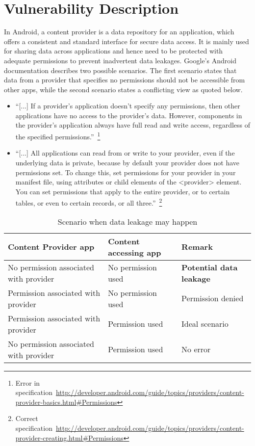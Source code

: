 \section{Vulnerability Description}
\label{vuln}
\noindent
In Android, a content provider is a data repository for an application, which offers a consistent and standard interface for secure data access. It is mainly used for sharing data across applications and hence need to be protected with adequate permissions to prevent inadvertent data leakages. Google's Android documentation describes two possible scenarios. The first scenario states that data from a provider that specifies no permissions should not be accessible from other apps, while the second scenario states a conflicting view as quoted below.
\begin{itemize}
 \item ``[...] If a provider's application doesn't specify any permissions, then other applications have no access to the provider's data. However, components in the provider's application always have full read and write access, regardless of the specified permissions.''~\footnote{Error in specification~\url{http://developer.android.com/guide/topics/providers/content-provider-basics.html#Permissions}}
 \item ``[...] All applications can read from or write to your provider, even if the underlying data is private, because by default your provider does not have permissions set. To change this, set permissions for your provider in your manifest file, using attributes or child elements of the <provider> element. You can set permissions that apply to the entire provider, or to certain tables, or even to certain records, or all three.''~\footnote{Correct specification~\url{http://developer.android.com/guide/topics/providers/content-provider-creating.html#Permissions}}
\end{itemize}
\begin{center}
	\begin{table}
		\label{tableErrors}
		\begin{tabular}{ | p{2.5cm} | p{2.5cm} | p{2cm} | }
			\hline
			\textbf{Content Provider app} & \textbf{Content accessing app} & \textbf{Remark} \\
			\hline \hline
			No permission associated with provider & No permission used & \textcolor[rgb]{1,0,0}{\textbf{Potential data leakage}} \\
			\hline
			Permission associated with provider & No permission used & Permission denied \\
			\hline
			Permission associated with provider & Permission used & Ideal scenario \\
			\hline
			No permission associated with provider & Permission used & No error \\
			\hline
		\end{tabular}
		\caption{Scenario when data leakage may happen}
	\end{table}
\end{center}
